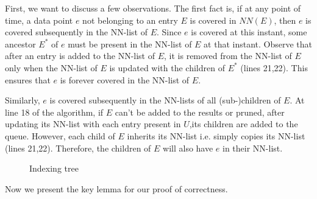 \documentclass[prodmode,letterpaper]{acmsmall}
\begin{document}
First, we want to discuss a few observations. The first fact is, if at
any point of time, a
data point $e$ not belonging to an entry $E$ is covered in $NN(E)$, then
$e$ is covered subsequently in the NN-list of $E$.
Since $e$ is covered at this instant, some ancestor $E^*$ of $e$ must be present in
the NN-list of $E$ at that instant. Observe that after an entry is added to the NN-list of $E$,
it is removed from the  NN-list of $E$ only when the NN-list of $E$ is updated
with the children of $E^*$ (lines 21,22). This ensures that $e$ is forever covered in the
NN-list of $E$.

Similarly, $e$ is covered subsequently
in the NN-lists of all (sub-)children of $E$.
At line 18 of the algorithm, if $E$ can't be added to the results or pruned,
after updating its NN-list with each entry present in $U$,its children are added
to the queue. However, each child of $E$ inherits its NN-list i.e. simply copies
its NN-list (lines 21,22). Therefore, the children of $E$ will also have $e$ in
their NN-list.


\begin{figure}[tp]
\begin{center}
\caption{\small Indexing tree \label{fig:proof}}
\end{center}
\end{figure}

Now we present the key lemma for our proof of correctness.
\end{document}
